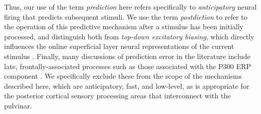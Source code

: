 \documentclass[11pt,twoside]{article}
\newif\myifpdf
\begin{document}
Thus, our use of the term \emph{prediction} here refers specifically to \emph{anticipatory} neural firing that predicts subsequent stimuli.  We use the term \emph{postdiction} to refer to the operation of this predictive mechanism after a stimulus has been initially processed, and distinguish both from \emph{top-down excitatory biasing}, which directly influences the online superficial layer neural representations of the current stimulus \citep{DesimoneDuncan95,ReynoldsChelazziDesimone99,MillerCohen01,OReillyWyatteHerdEtAl13}.  Finally, many discussions of prediction error in the literature include late, frontally-associated processes such as those associated with the P300 ERP component \citep{HolroydColes02}.  We specifically exclude these from the scope of the mechanisms described here, which are anticipatory, fast, and low-level, as is appropriate for the posterior cortical sensory processing areas that interconnect with the pulvinar.
\end{document}
